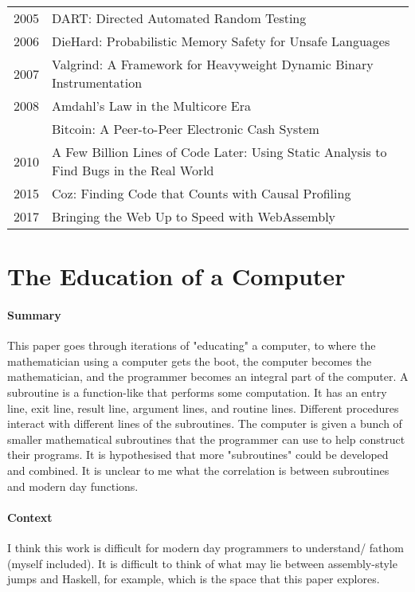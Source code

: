 {\begin{tabular}{r |@{\foo} l}
2005 & DART: Directed Automated Random Testing \cite{godefroid2005dart} \\
2006 & DieHard: Probabilistic Memory Safety for Unsafe Languages \cite{berger2006diehard} \\
2007 & Valgrind: A Framework for Heavyweight Dynamic Binary Instrumentation \cite{nethercote2007valgrind} \\
2008 & Amdahl’s Law in the Multicore Era \cite{hill2008amdahl} \\
     & Bitcoin: A Peer-to-Peer Electronic Cash System \cite{nakamoto2008bitcoin} \\
2010 & A Few Billion Lines of Code Later: Using Static Analysis to Find Bugs in the Real World \cite{bessey2010few} \\
2015 & Coz: Finding Code that Counts with Causal Profiling \cite{curtsinger2015c} \\
2017 & Bringing the Web Up to Speed with WebAssembly \cite{haas2017bringing} \\

\end{tabular}
}

\newpage

\section {The Education of a Computer \cite{hopper1952education}}

\paragraph{\textbf{Summary}}
This paper goes through iterations of "educating" a computer, to where the
mathematician using a computer gets the boot, the computer becomes the
mathematician, and the programmer becomes an integral part of the computer. A
subroutine is a function-like that performs some computation. It has an entry
line, exit line, result line, argument lines, and routine lines. Different
procedures interact with different lines of the subroutines. The computer is
given a bunch of smaller mathematical subroutines that the programmer can use to
help construct their programs. It is hypothesised that more "subroutines" could
be developed and combined. It is unclear to me what the correlation is between
subroutines and modern day functions.
\paragraph{\textbf{Context}}
I think this work is difficult for modern day programmers to understand/ fathom
(myself included). It is difficult to think of what may lie between
assembly-style jumps and Haskell, for example, which is the space that this
paper explores.
